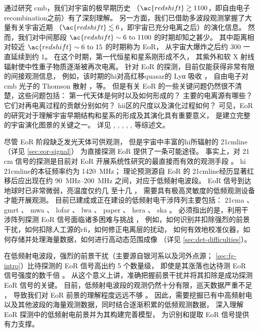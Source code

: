 通过研究 \ac{cmb}，我们对宇宙的极早期历史
（$\ac{redshift} \gtrsim 1100$，即自由电子\ac{recombination}之前）有了深刻理解。
另一方面，我们已借助多波段观测掌握了大量有关宇宙近期
（$\ac{redshift} \lesssim 6$，即宇宙已充分电离之后）的演化信息。
然而，我们对中间那段 $\ac{redshift} \sim \numrange{6}{1100}$ 的时期却知之甚少。
其中距离相对较近 $\ac{redshift} \sim \numrange{6}{15}$ 的时期称为 EoR，
从宇宙大爆炸之后约 \SI{300}{\Myr} 一直延续到约 \SI{1}{\Gyr}。
在这个时期，第一代恒星和星系刚形成不久，
其紫外和软 X 射线辐射使中性重子物质逐渐被再次电离。
针对 EoR 的探测，目前仅能获得非常有限的间接观测信息，
例如，该时期的\ac{hi}对高红移\ac{quasar}的 Lyα 吸收 \cite{becker2001}，
自由电子对 \ac{cmb} 光子的 Thomson 散射 \cite{kaplinghat2003}，等。
但是有关 EoR 的一些关键问题仍然很不清楚，这些问题包括：
第一代天体是何时以及如何形成的？
主要的电离源有哪些？它们对再电离过程的贡献分别如何？
\ac{hii}区的尺度以及演化过程如何？
可见，EoR 的研究对于理解宇宙早期结构和星系的形成及其演化具有重要意义，
是建立完整的宇宙演化图景的关键之一。
详见 , ,
, ,
,  等综述文。

尽管 EoR 阶段缺乏发光天体可供观测，
但是宇宙中丰富的\ac{hi}所辐射的 \ac{21cmline}（详见 \autoref{sec:eor-signal}）
为直接探测 EoR 提供了一条可能途径。
事实上，对 21\,cm 信号的探测是目前对 EoR 开展系统性研究的最直接而有效的观测手段
\cite{madau1997,tozzi2000,furlanetto2006,koopmans2015,furlanetto2016}。
\ac{hi} \ac{21cmline}的本征频率约为 \SI{1420}{\MHz}；
理论预测源自 EoR 的 \ac{21cmline}经历显著红移后应出现在约
\SIrange{90}{200}{\MHz} 之间，对应于低频射电波段。
EoR 信号到达地球时已非常微弱，亮温度仅约几 \si{\mK} 至十几 \si{\mK}，
需要具有极高灵敏度的低频观测设备才能开展观测。
目前已建成或正在建设的低频射电干涉阵列主要包括：
\ac{21cma} \cite{zheng2016}、
\ac{gmrt} \cite{paciga2011}、
\ac{mwa} \cite{bowman2013,tingay2013}、
\ac{lofar} \cite{vanHaarlem2013}、
\ac{lwa} \cite{ellingson2009}、
\ac{paper} \cite{parsons2010}、
\ac{hera} \cite{deBoer2017}、
\ac{ska} \cite{mellema2013,koopmans2015}。
必须指出的是，利用干涉阵列探测 EoR 信号面临诸多困难与挑战
\cite{morales2010,wijnholds2010}，
例如，如何识别并扣除强烈的前景干扰，如何扣除人工源的\ac{rfi}，如何修正电离层的扰动，
如何有效地校准仪器，如何存储并处理海量数据，如何进行高动态范围成像
（详见 \autoref{sec:det-difficulties}）。

在低频射电波段，强烈的前景干扰（主要源自银河系以及河外点源；
\autoref{sec:fg-intro}）比待探测的 EoR 信号高出约 5 个数量级，
即使是其涨落也达待测 EoR 信号强度的数千倍 \cite{zaroubi2013}。
从这个意义上讲，准确把握前景干扰并将其扣除是成功探测 EoR 信号的关键。
目前，低频射电波段的观测仍然十分有限，巡天数据严重不足
\cite{deOliveiraCosta2008,zheng2017gal}，
导致我们对 EoR 前景的理解程度远远不够
\cite{liu2012,harker2015,offringa2016,murray2017,procopio2017}。
因此，需要挖掘已有中高频射电以及其他波段的海量观测数据，同时结合逐渐积累的低频观测数据，
深入理解 EoR 探测中的低频射电前景并为其构建完善模型，
为识别和提取 EoR 信号提供有力支撑。


